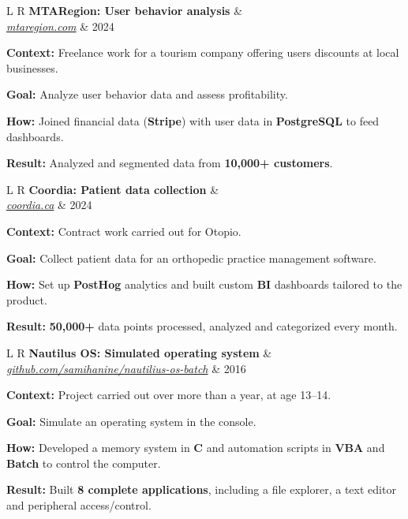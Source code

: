 \documentclass[a4paper,10pt]{article}
\newcommand{\resumeSubheading}[4]{%
  \item
    \begin{tabularx}{\linewidth}{L R}
      \textbf{#1} & \textit{\footnotesize #2} \\
      \textit{\footnotesize #3} & \footnotesize #4 \\
    \end{tabularx}
}
\newcommand{\resumeItem}[1]{\item #1}
\begin{document}
  \resumeSubheading
    {MTARegion: User behavior analysis}{}{\href{https://mtaregion.com/}{mtaregion.com}}{2024}
    \projItemStart
      \resumeItem{\textbf{Context:} Freelance work for a tourism company offering users discounts at local businesses.}
      \resumeItem{\textbf{Goal:} Analyze user behavior data and assess profitability.}
      \resumeItem{\textbf{How:} Joined financial data (\textbf{Stripe}) with user data in \textbf{PostgreSQL} to feed dashboards.}
      \resumeItem{\textbf{Result:} Analyzed and segmented data from \textbf{10,000+ customers}.}
    \projItemEnd

  \resumeSubheading
    {Coordia: Patient data collection}{}{\href{https://www.coordia.ca/}{coordia.ca}}{2024}
    \projItemStart
      \resumeItem{\textbf{Context:} Contract work carried out for Otopio.}
      \resumeItem{\textbf{Goal:} Collect patient data for an orthopedic practice management software.}
      \resumeItem{\textbf{How:} Set up \textbf{PostHog} analytics and built custom \textbf{BI} dashboards tailored to the product.}
      \resumeItem{\textbf{Result:} \textbf{50,000+} data points processed, analyzed and categorized every month.}
    \projItemEnd

  \resumeSubheading
    {Nautilus OS: Simulated operating system}{}{\href{https://github.com/samihanine/nautilius-os-batch}{github.com/samihanine/nautilius-os-batch}}{2016}
    \projItemStart
      \resumeItem{\textbf{Context:} Project carried out over more than a year, at age 13--14.}
      \resumeItem{\textbf{Goal:} Simulate an operating system in the console.}
      \resumeItem{\textbf{How:} Developed a memory system in \textbf{C} and automation scripts in \textbf{VBA} and \textbf{Batch} to control the computer.}
      \resumeItem{\textbf{Result:} Built \textbf{8 complete applications}, including a file explorer, a text editor and peripheral access/control.}
    \projItemEnd

\projListEnd
\end{document}
